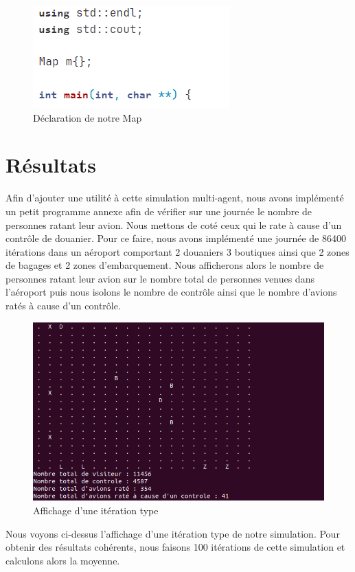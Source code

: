 \documentclass[12pt,french]{article} %
\begin{document}
\begin{figure}[H]
	\centering
	\includegraphics[scale=1]{map.png}
	\caption{Déclaration de notre Map}    
\end{figure}
\section{Résultats}

Afin d'ajouter une utilité à cette simulation multi-agent, nous avons implémenté un petit programme annexe afin de vérifier sur une journée le nombre de personnes ratant leur avion. Nous mettons de coté ceux qui le rate à cause d'un contrôle de douanier. Pour ce faire, nous avons implémenté une journée de 86400 itérations dans un aéroport comportant 2 douaniers 3 boutiques ainsi que 2 zones de bagages et 2 zones d'embarquement. Nous afficherons alors le nombre de personnes ratant leur avion sur le nombre total de personnes venues dans l'aéroport puis nous isolons le nombre de contrôle ainsi que le nombre d'avions ratés à cause d'un contrôle. 



\begin{figure}[H]
	\centering
	\includegraphics[scale=0.6]{ite.png}
	\caption{Affichage d'une itération type}    
\end{figure}

Nous voyons ci-dessus l'affichage d'une itération type de notre simulation. Pour obtenir des résultats cohérents, nous faisons 100 itérations de cette simulation et calculons alors la moyenne.  
\newline
\end{document}
